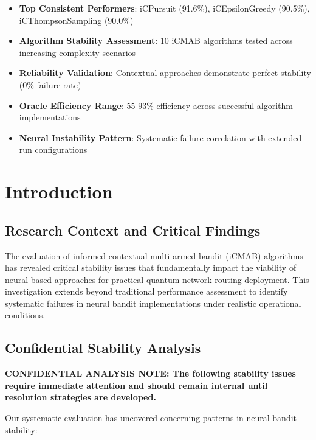 \documentclass[12pt,a4paper]{article}
\newcommand{\performance}[1]{\textcolor{performancecolor}{\textbf{#1}}}
\newcommand{\stochastic}[1]{\textcolor{stochasticcolor}{\textbf{#1}}}
\newcommand{\critical}[1]{\textcolor{criticalcolor}{\textbf{#1}}}
\newcommand{\success}[1]{\textcolor{successcolor}{\textbf{#1}}}
\begin{document}
\begin{tcolorbox}[colback=highlightcolor!30,colframe=performancecolor,title=\textbf{Key Performance Results Summary}]
\begin{itemize}
\item \performance{Top Consistent Performers}: iCPursuit (91.6\%), iCEpsilonGreedy (90.5\%), iCThompsonSampling (90.0\%)
\item \stochastic{Algorithm Stability Assessment}: 10 iCMAB algorithms tested across increasing complexity scenarios
\item \success{Reliability Validation}: Contextual approaches demonstrate perfect stability (0\% failure rate)
\item \performance{Oracle Efficiency Range}: 55-93\% efficiency across successful algorithm implementations  
\item \critical{Neural Instability Pattern}: Systematic failure correlation with extended run configurations
\end{itemize}
\end{tcolorbox}

\section{Introduction}

\subsection{Research Context and Critical Findings}

The evaluation of informed contextual multi-armed bandit (iCMAB) algorithms has revealed critical stability issues that fundamentally impact the viability of neural-based approaches for practical quantum network routing deployment. This investigation extends beyond traditional performance assessment to identify systematic failures in neural bandit implementations under realistic operational conditions.

\subsection{Confidential Stability Analysis}

\critical{CONFIDENTIAL ANALYSIS NOTE: The following stability issues require immediate attention and should remain internal until resolution strategies are developed.}

Our systematic evaluation has uncovered concerning patterns in neural bandit stability:
\end{document}
